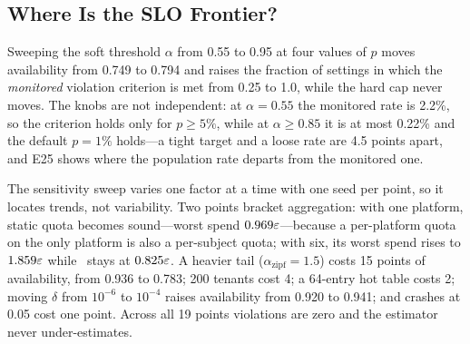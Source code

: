 \subsection{Where Is the SLO Frontier?}
\label{sec:eval-slo}

Sweeping the soft threshold $\alpha$ from 0.55 to 0.95 at four values of $p$ moves
availability from 0.749 to 0.794 and raises the fraction of settings in which the
\emph{monitored} violation criterion is met from 0.25 to 1.0, while the hard cap never
moves. The knobs are not independent: at $\alpha{=}0.55$ the monitored rate is 2.2\%,
so the criterion holds only for $p\ge5\%$, while at $\alpha\ge0.85$ it is at most
0.22\% and the default $p{=}1\%$ holds---a tight target and a loose rate are 4.5
points apart, and E25 shows where the population rate departs from the monitored one.


The sensitivity sweep varies one factor at a time with one seed per point, so it
locates trends, not variability. Two points bracket aggregation: with one platform, static quota becomes
sound---worst spend $0.969\varepsilon$---because a per-platform quota on the only platform is
also a per-subject quota; with six, its worst spend rises to $1.859\varepsilon$ while \sys\
stays at $0.825\varepsilon$.
A heavier tail ($\alpha_{\mathrm{zipf}}{=}1.5$) costs 15 points of availability,
from 0.936 to 0.783; 200 tenants cost 4; a 64-entry hot table costs 2; moving
$\delta$ from $10^{-6}$ to $10^{-4}$ raises availability from 0.920 to 0.941; and
crashes at 0.05 cost one point. Across all 19 points violations are zero and the
estimator never under-estimates.
